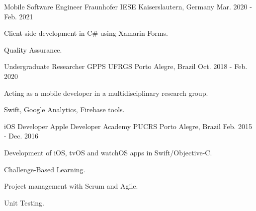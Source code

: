 

\begin{cventries}

  \cventry
    {Mobile Software Engineer} %
    {Fraunhofer IESE} %
    {Kaiserslautern, Germany} %
    {Mar. 2020 - Feb. 2021} %
    {
      \begin{cvitems} %
        \item {Client-side development in C\# using Xamarin-Forms. }
        \item {Quality Assurance.}
      \end{cvitems}
    }

  \cventry
    {Undergraduate Researcher} %
    {GPPS UFRGS} %
    {Porto Alegre, Brazil} %
    {Oct. 2018 - Feb. 2020} %
    {
      \begin{cvitems} %
        \item {Acting as a mobile developer in a multidisciplinary research group.}
        \item {Swift, Google Analytics, Firebase tools.}
        \end{cvitems}
    }

  \cventry
    {iOS Developer} %
    {Apple Developer Academy PUCRS} %
    {Porto Alegre, Brazil} %
    {Feb. 2015 - Dec. 2016} %
    {
      \begin{cvitems} %
        \item {Development of iOS, tvOS and watchOS apps in Swift/Objective-C.}
      \item {Challenge-Based Learning.}
      \item {Project management with Scrum and Agile.}
      \item {Unit Testing.}
      \end{cvitems}
    }

\end{cventries}
